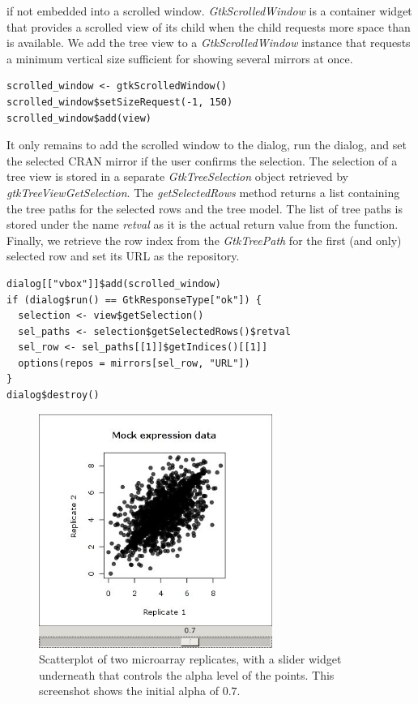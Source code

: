 \documentclass[article]{jss}
\begin{document}
if not embedded into a scrolled window. \emph{GtkScrolledWindow} is a container 
widget that provides a scrolled view of its child when the child requests more
space than is available. We add the tree view to a \emph{GtkScrolledWindow} 
instance that requests a minimum vertical size sufficient for showing several 
mirrors at once.
\begin{verbatim}
scrolled_window <- gtkScrolledWindow()
scrolled_window$setSizeRequest(-1, 150)
scrolled_window$add(view)
\end{verbatim}
It only remains to add the scrolled window to the dialog, run the dialog, and
set the selected CRAN mirror if the user confirms the selection. The selection
of a tree view is stored in a separate \emph{GtkTreeSelection} object retrieved
by \emph{gtkTreeViewGetSelection}. The \emph{getSelectedRows} method returns a 
list containing the tree paths for the selected rows and the tree model. The 
list of tree paths is stored under the name \emph{retval} as it is the actual
return value from the  function. Finally, we retrieve the row index
from the \emph{GtkTreePath} for the first (and only) selected row and set its 
URL as the repository.
\begin{verbatim}
dialog[["vbox"]]$add(scrolled_window)
if (dialog$run() == GtkResponseType["ok"]) {
  selection <- view$getSelection()
  sel_paths <- selection$getSelectedRows()$retval
  sel_row <- sel_paths[[1]]$getIndices()[[1]]
  options(repos = mirrors[sel_row, "URL"])
}
dialog$destroy()
\end{verbatim}

\begin{figure}
\begin{center}
\includegraphics[width=3in]{demo-alpha-random-07-3}
\caption{\label{fig:rgtk2-demo-initial}Scatterplot of two microarray replicates,
with a slider widget underneath that controls the alpha level of the
points. This screenshot shows the initial alpha of $0.7$.}
\end{center}
\end{figure}
\end{document}
